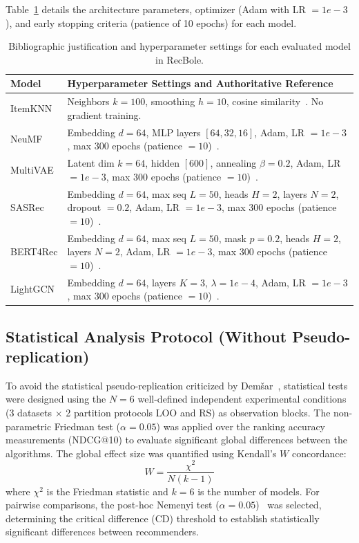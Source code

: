 \documentclass[journal]{IEEEtran}
\makeatletter
\newcommand{\at}[1]{@#1}
\makeatother
\begin{document}
Table~\ref{tab:hyperparams} details the architecture parameters, optimizer (Adam with LR $= 1e-3$), and early stopping criteria (patience of 10 epochs) for each model.

\begin{table}[h]
\centering
\caption{Bibliographic justification and hyperparameter settings for each evaluated model in RecBole.}
\label{tab:hyperparams}
\footnotesize
\setlength{\tabcolsep}{2.5pt}
\begin{tabular}{lp{5.5cm}}
\toprule
\textbf{Model} & \textbf{Hyperparameter Settings and Authoritative Reference} \\
\midrule
ItemKNN  & Neighbors $k=100$, smoothing $h=10$, cosine similarity~\cite{sarwar2001item}. No gradient training. \\
NeuMF    & Embedding $d=64$, MLP layers $[64, 32, 16]$, Adam, LR $= 1e-3$, max 300 epochs (patience $= 10$)~\cite{he2017neural}. \\
MultiVAE & Latent dim $k=64$, hidden $[600]$, annealing $\beta=0.2$, Adam, LR $= 1e-3$, max 300 epochs (patience $= 10$)~\cite{liang2018variational}. \\
SASRec   & Embedding $d=64$, max seq $L=50$, heads $H=2$, layers $N=2$, dropout $= 0.2$, Adam, LR $= 1e-3$, max 300 epochs (patience $= 10$)~\cite{kang2018self}. \\
BERT4Rec & Embedding $d=64$, max seq $L=50$, mask $p=0.2$, heads $H=2$, layers $N=2$, Adam, LR $= 1e-3$, max 300 epochs (patience $= 10$)~\cite{sun2019bert4rec}. \\
LightGCN & Embedding $d=64$, layers $K=3$, $\lambda=1e-4$, Adam, LR $= 1e-3$, max 300 epochs (patience $= 10$)~\cite{he2020lightgcn}. \\
\bottomrule
\end{tabular}
\end{table}

\subsection{Statistical Analysis Protocol (Without Pseudo-replication)}
To avoid the statistical pseudo-replication criticized by Demšar~\cite{demsar2006statistical}, statistical tests were designed using the $N=6$ well-defined independent experimental conditions (3 datasets $\times$ 2 partition protocols LOO and RS) as observation blocks. The non-parametric Friedman test ($\alpha = 0.05$) was applied over the ranking accuracy measurements (NDCG\at{10}) to evaluate significant global differences between the algorithms. The global effect size was quantified using Kendall's $W$ concordance:
\begin{equation}
W = \frac{\chi^2}{N(k - 1)}
\end{equation}
where $\chi^2$ is the Friedman statistic and $k=6$ is the number of models. For pairwise comparisons, the post-hoc Nemenyi test ($\alpha = 0.05$)~\cite{demsar2006statistical} was selected, determining the critical difference (CD) threshold to establish statistically significant differences between recommenders.
\end{document}
